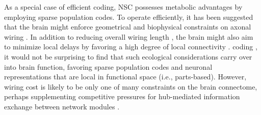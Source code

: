 As a special case of efficient coding,
\ac{NSC} possesses metabolic advantages by employing
sparse population codes.
To operate efficiently, it has been suggested that the brain might enforce 
geometrical and biophysical constraints on axonal wiring 
\cite{LaughlinSejnowski2003}.
In addition to reducing overall wiring length
\cite{Cherniak1994}, the brain might also aim to minimize local delays
by favoring a high degree of local connectivity
\cite{Chklovskii2002}.
 coding \cite{Clopath2010},
it would not be surprising to find that such ecological considerations
carry over into brain function,
favoring sparse population codes and neuronal representations that are
local in functional space (i.e., parts-based).
However, wiring cost is likely to be only one of many constraints 
on the brain connectome, perhaps supplementing competitive pressures
for hub-mediated information exchange between network modules
\cite{Rubinov2015}.

